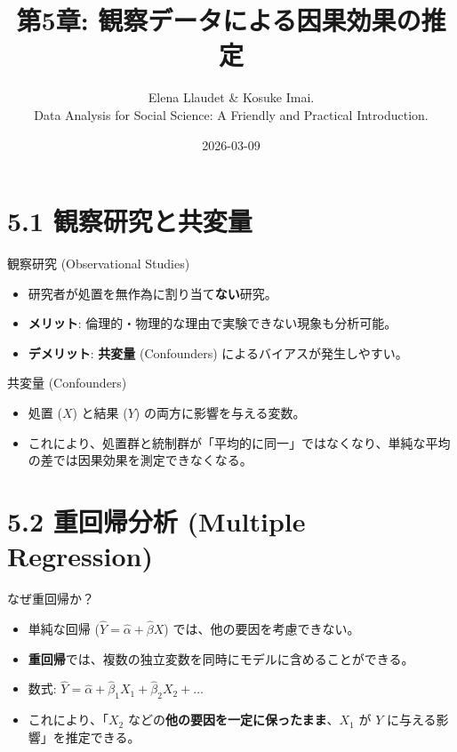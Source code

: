 \documentclass[
  ignorenonframetext,
]{beamer}
\title{第5章: 観察データによる因果効果の推定}
\subtitle{Elena Llaudet \& Kosuke Imai.\\
Data Analysis for Social Science: A Friendly and Practical
Introduction.}
\author{}
\date{\vspace{-2.5em}2026-03-09}
\providecommand{\tightlist}{%
  \setlength{\itemsep}{0pt}\setlength{\parskip}{0pt}}
\begin{document}
\frame{\titlepage}

\hypertarget{ux89b3ux5bdfux7814ux7a76ux3068ux5171ux5909ux91cf}{%
\section{5.1
観察研究と共変量}\label{ux89b3ux5bdfux7814ux7a76ux3068ux5171ux5909ux91cf}}

\begin{frame}{観察研究 (Observational Studies)}
\protect\hypertarget{ux89b3ux5bdfux7814ux7a76-observational-studies}{}
\begin{itemize}
\tightlist
\item
  研究者が処置を無作為に割り当て\textbf{ない}研究。
\item
  \textbf{メリット}: 倫理的・物理的な理由で実験できない現象も分析可能。
\item
  \textbf{デメリット}: \textbf{共変量} (Confounders)
  によるバイアスが発生しやすい。
\end{itemize}
\end{frame}

\begin{frame}{共変量 (Confounders)}
\protect\hypertarget{ux5171ux5909ux91cf-confounders}{}
\begin{itemize}
\tightlist
\item
  処置 (\(X\)) と結果 (\(Y\)) の両方に影響を与える変数。
\item
  これにより、処置群と統制群が「平均的に同一」ではなくなり、単純な平均の差では因果効果を測定できなくなる。
\end{itemize}
\end{frame}

\hypertarget{ux91cdux56deux5e30ux5206ux6790-multiple-regression}{%
\section{5.2 重回帰分析 (Multiple
Regression)}\label{ux91cdux56deux5e30ux5206ux6790-multiple-regression}}

\begin{frame}{なぜ重回帰か？}
\protect\hypertarget{ux306aux305cux91cdux56deux5e30ux304b}{}
\begin{itemize}
\tightlist
\item
  単純な回帰 (\(\hat{Y} = \hat{\alpha} + \hat{\beta} X\))
  では、他の要因を考慮できない。
\item
  \textbf{重回帰}では、複数の独立変数を同時にモデルに含めることができる。
\item
  数式:
  \(\hat{Y} = \hat{\alpha} + \hat{\beta}_1 X_1 + \hat{\beta}_2 X_2 + \dots\)
\item
  これにより、「\(X_2\)
  などの\textbf{他の要因を一定に保ったまま}、\(X_1\) が \(Y\)
  に与える影響」を推定できる。
\end{itemize}
\end{frame}
\end{document}

